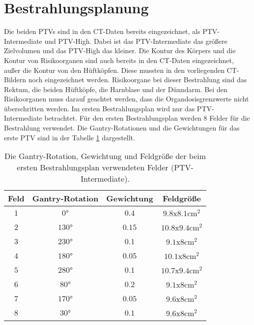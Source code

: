 \section{Bestrahlungsplanung}
\label{sec:Bestrahlungsplanung}
Die beiden PTVs sind in den CT-Daten bereits eingezeichnet, als PTV-Intermediate und PTV-High.
Dabei ist das PTV-Intermediate das größere Zielvolumen und das PTV-High das kleiner.
Die Kontur des Körpers und die Kontur von Risikoorganen sind auch bereits in den CT-Daten eingezeichnet, außer die Kontur von den Hüftköpfen.
Diese mussten in den vorliegenden CT-Bildern noch eingezeichnet werden. Risikoorgane bei dieser Bestrahlung sind das Rektum, die beiden
Hüftköpfe, die Harnblase und der Dünndarm. Bei den Risikoorganen muss darauf geachtet werden, dass die Organdosisgrenzwerte nicht überschritten werden.
Im ersten Bestrahlungsplan wird nur das PTV-Intermediate betrachtet. Für den ersten Bestrahlungsplan werden 8 Felder für die Bestrahlung verwendet.
Die Gantry-Rotationen und die Gewichtungen für das erste PTV sind in der Tabelle \ref{tab:Felder1} dargestellt.

\begin{table}
	\centering
	\caption{Die Gantry-Rotation, Gewichtung und Feldgröße der beim ersten Bestrahlungsplan verwendeten Felder (PTV-Intermediate).}
	\label{tab:Felder1}
	\begin{tabular}{c c c c}
		\toprule
		Feld & Gantry-Rotation & Gewichtung & Feldgröße\\
		\midrule
		$1$ & $0°$   & $0.4$ & $\num{9.8}$x$\num{8.1} \si{\centi\meter\squared}$ \\
		$2$ & $130°$  & $0.15$ & $\num{10.8}$x$\num{9.4} \si{\centi\meter\squared}$ \\
		$3$ & $230°$ & $0.1$ & $\num{9.1}$x$\num{8} \si{\centi\meter\squared}$ \\
		$4$ & $180°$ & $0.05$ & $\num{10.1}$x$\num{8} \si{\centi\meter\squared}$ \\
		$5$ & $280°$ & $0.1$ & $\num{10.7}$x$\num{9.4} \si{\centi\meter\squared}$ \\
		$6$ & $80°$ & $0.2$ & $\num{9.1}$x$\num{8} \si{\centi\meter\squared}$ \\
		$7$ & $170°$ & $0.05$ & $\num{9.6}$x$\num{8} \si{\centi\meter\squared}$ \\
		$8$ & $30°$ & $0.1$ & $\num{9.6}$x$\num{8} \si{\centi\meter\squared}$ \\
		\bottomrule
	\end{tabular}
\end{table}

